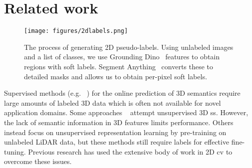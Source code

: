 \section{Related work}
{\begin{figure*}
\texttt{[image: figures/2dlabels.png]}
\caption{The process of generating 2D pseudo-labels. Using unlabeled images and a list of classes, we use Grounding Dino~\cite{liu_grounding_2023} features to obtain regions with soft labels. Segment Anything~\cite{kirillov_segment_2023} converts these to detailed masks and allows us to obtain per-pixel soft labels.}
\vspace*{-\baselineskip}
\label{2dlabels}
\end{figure*}}

Supervised methods (e.g. ~\cite{maturana_voxnet_2015, graham_3d_2018, vedaldi_searching_2020, zhu_cylindrical_2021, zhao_svaseg_2022, lai_spherical_2023, zhang_occformer_2023, cao_monoscene_2022, wu_squeezesegv2_2018, milioto_rangenet_2019, cortinhal_salsanext_2020, zhang_polarnet_2020, kong_rethinking_2023, roldao_lmscnet_2020, cheng_s3cnet_2020, zuo_pointocc_2023, huang_tri-perspective_2023, qi_pointnet_2017, charles_pointnet_2017, thomas_kpconv_2019, hu_randla-net_2020, wu_point_2022, cheng_af_2021, xu_rpvnet_2021, ye_lidarmultinet_2023, lu_lidar-camera_2024}) for the online prediction of 3D semantics require large amounts of labeled 3D data which is often not available for novel application domains. 
Some approaches ~\cite{zhang_growsp_2023, liu_u3ds3_nodate} attempt unsupervised 3D \gls{ss}. However, the lack of semantic information in 3D features limits performance. Others~\cite{xie_pointcontrast_2020, zhang_self-supervised_2021, nunes_segcontrast_2022, zhu_ponderv2_2023} instead focus on unsupervised representation learning by pre-training on unlabeled LiDAR data, but these methods still require labels for effective fine-tuning. 
Previous research has used the extensive body of work in 2D \gls{cv} to overcome these issues.


